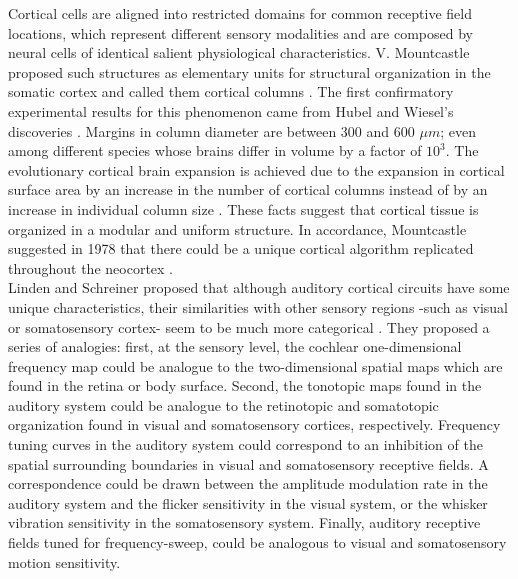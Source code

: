 \documentclass[11pt,a4paper]{article}
\begin{document}
Cortical cells are aligned into restricted domains for common receptive field locations,
which represent different sensory modalities and are composed by neural cells of identical
salient physiological characteristics.
V. Mountcastle proposed such structures as elementary units for structural organization
in the somatic cortex and called them cortical columns \cite{mountcastle_1955, mountcastle_1957}.
The first confirmatory experimental results for this phenomenon came from Hubel and Wiesel’s
discoveries \cite{hubel_1962, hubel_1968}.
Margins in column diameter are between 300 and 600 $\mu m$; even
among different species whose brains differ in volume by a factor of $10^3$.
The evolutionary cortical brain expansion is achieved due to the expansion in
cortical surface area by an increase in the number of cortical columns
instead of by an increase in individual column size \cite{rakic_1995}.
These facts suggest that cortical tissue is organized in a modular and uniform structure.
In accordance, Mountcastle suggested in 1978 that there could be
a unique cortical algorithm replicated throughout the neocortex
\cite{mountcastle_1978}.\\

Linden and Schreiner proposed that although auditory
cortical circuits have some unique characteristics,
their similarities with other sensory regions -such as visual or somatosensory cortex-
seem to be much more categorical \cite{linden_2003}.
They proposed a series of analogies:
first, at the sensory level, the cochlear one-dimensional frequency map
could be analogue to the two-dimensional spatial maps which are found
in the retina or body surface.
Second, the tonotopic maps found in the auditory system could be analogue to the
retinotopic and somatotopic organization found in visual and somatosensory cortices,
respectively.
Frequency tuning curves in the auditory system could correspond to an inhibition of
the spatial surrounding boundaries in visual and somatosensory receptive fields.
A correspondence could be drawn between the amplitude modulation rate
in the auditory system and the flicker sensitivity in the visual system, or
the whisker vibration sensitivity in the somatosensory system.
Finally, auditory receptive fields tuned for frequency-sweep, could be
analogous to visual and somatosensory motion sensitivity.\\
\end{document}

